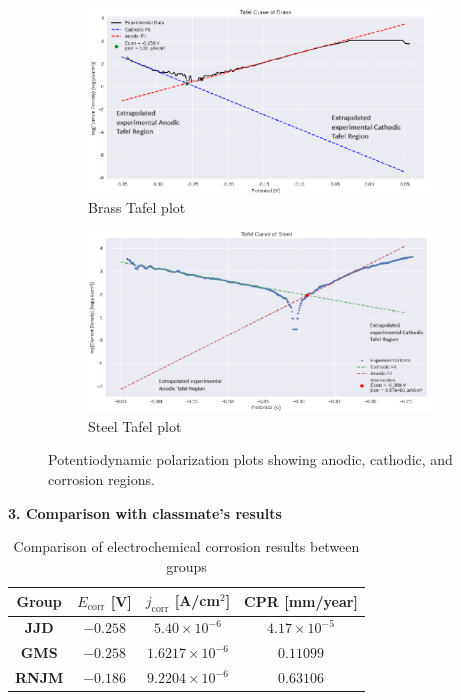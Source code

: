 \begin{figure}[ht!]
    \centering
    \begin{subfigure}{0.45\textwidth}
        \includegraphics[width=\linewidth]{Figures/Tafel Brass.png}
        \caption{Brass Tafel plot}
        \label{fig:tafel_brass}
    \end{subfigure}
    \hfill
    \begin{subfigure}{0.45\textwidth}
        \includegraphics[width=\linewidth]{Figures/Tafel Steel.png}
        \caption{Steel Tafel plot}
        \label{fig:tafel_steel}
    \end{subfigure}
    \caption{Potentiodynamic polarization plots showing anodic, cathodic, and corrosion regions.}
\end{figure}

\vspace{0.5cm}

\textbf{3. Comparison with classmate's results}


\vspace{0.2cm}
\begin{table}[h!]
\centering
\caption{Comparison of electrochemical corrosion results between groups}
\label{tab:cpr_groups}
\begin{tabular}{|c|c|c|c|}
\hline
Group & \( E_{\text{corr}} \) [V] & \( j_{\text{corr}} \) [A/cm\(^2\)] & CPR [mm/year] \\
\hline
\textbf{JJD}  & \(-0.258\) & \( 5.40 \times 10^{-6} \) & \( 4.17 \times 10^{-5} \) \\
\hline
\textbf{GMS}  & \(-0.258\) & \( 1.6217 \times 10^{-6} \) & \( 0.11099 \) \\
\hline
\textbf{RNJM} & \(-0.186\) & \( 9.2204 \times 10^{-6} \) & \( 0.63106 \) \\
\hline
\end{tabular}
\end{table}

